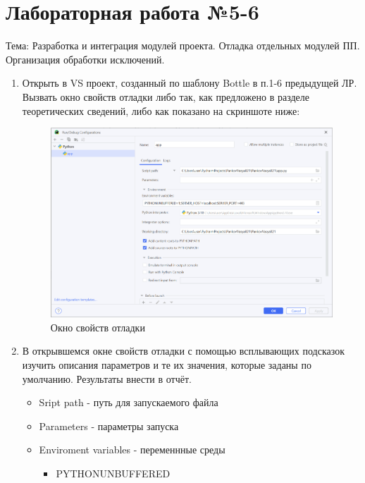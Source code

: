\documentclass[14pt]{extarticle}
\begin{document}
\tableofcontents \clearpage

\section{Лабораторная работа №5-6}
\label{sec:org14b88b7}


Тема: Разработка и интеграция модулей проекта. Отладка отдельных модулей ПП. Организация обработки исключений.

\begin{enumerate}
\item Открыть в VS проект, созданный по шаблону Bottle в п.1-6 предыдущей ЛР.
Вызвать окно свойств отладки либо так, как предложено в разделе теоретических сведений, либо как показано на скриншоте ниже:

\begin{figure}[H]
\centering
\includegraphics[width=.9\linewidth]{images/2023-04-12_09-41-37_screenshot.png}
\caption{Окно свойств отладки}
\end{figure}

\item В открывшемся окне свойств отладки с помощью всплывающих подсказок изучить
описания параметров и те их значения, которые заданы по умолчанию. Результаты внести в отчёт.

\begin{itemize}
\item Sript path - путь для запускаемого файла

\item Parameters - параметры запуска

\item Enviroment variables - переменнные среды

\begin{itemize}
\item PYTHONUNBUFFERED


\end{itemize}
\end{itemize}
\end{enumerate}
\end{document}
